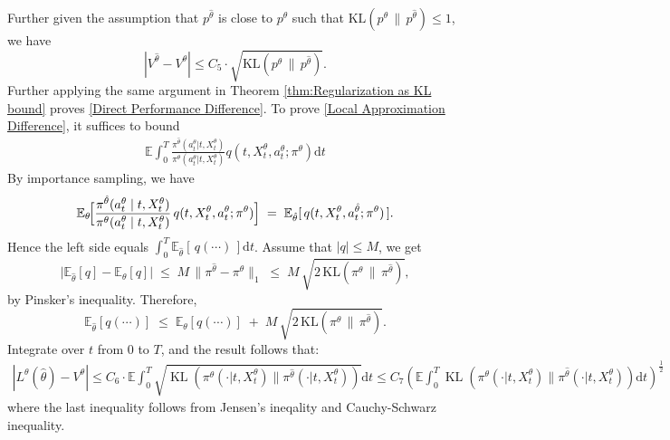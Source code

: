\documentclass{article}
\theoremstyle{plain}
\theoremstyle{definition}
\theoremstyle{remark}
\begin{document}
Further given the assumption that $p^{\hat{\theta}}$ is close to $p^{\theta}$ such that $\mathrm{KL}(p^{\theta} \,\|\, p^{\hat{\theta}})\leq 1$, we have 
$$
|V^{\hat{\theta}} - V^{\theta}|\leq C_5\cdot \sqrt{\mathrm{KL}(p^{\theta} \,\|\, p^{\hat{\theta}})}.
$$
Further applying the same argument in Theorem \ref{thm:Regularization as KL bound} proves \eqref{Direct Performance Difference}. To prove \eqref{Local Approximation Difference}, it suffices to bound 
\begin{eqnarray}
\mathbb{E}\int _ { 0 } ^ { T } \frac{\pi^ { \hat{\theta}}( a _ { t } ^ {\theta} | t , X _ { t } ^ {\theta} )}{\pi^ { \theta}( a _ { t } ^ {\theta} | t , X _ { t } ^ {\theta} )} q(t, X_t^{\theta}, a_t^{\theta} ; \pi^\theta)\mathrm{d} t
\end{eqnarray}
By importance sampling, we have
\[
\mathbb{E}_{\theta}\!\Bigl[
  \frac{\pi^{\hat{\theta}}(a_{t}^{\theta}\mid t, X_{t}^{\theta})}%
       {\pi^{\theta}(a_{t}^{\theta}\mid t, X_{t}^{\theta})}
  \,q(t, X_t^{\theta}, a_t^{\theta} ; \pi^\theta)
\Bigr]
\;=\;
\mathbb{E}_{\hat{\theta}}[\,q(t, X_t^{\theta}, a_t^{\hat{\theta}} ; \pi^\theta)\,].
\]
Hence the left side equals
$\int_0^T \mathbb{E}_{\hat{\theta}}[\,q(\cdots)\,]\mathrm{d}t$.
Assume that $|q|\le M$, we get
\[
\bigl|\mathbb{E}_{\hat{\theta}}[q] - \mathbb{E}_\theta[q]\bigr|
\;\le\;
M\,\|\pi^{\hat{\theta}} - \pi^\theta\|_1
\;\le\;
M\,\sqrt{2\,\mathrm{KL}(\pi^\theta\,\|\,\pi^{\hat{\theta}})},
\]
by Pinsker’s inequality.  Therefore,
\[
\mathbb{E}_{\hat{\theta}}[q(\cdots)]
\;\le\;
\mathbb{E}_\theta[q(\cdots)]
\;+\;
M\,\sqrt{2\,\mathrm{KL}(\pi^\theta\,\|\,\pi^{\hat{\theta}})}.
\]
Integrate over $t$ from $0$ to $T$, and the result follows that:
\begin{align}
|L^{\theta}(\hat{\theta}) - V^{\theta}|\leq C_6 \cdot \mathbb{E}\int_{0}^{T} \sqrt{\operatorname{KL}(\pi^{\theta}(\cdot | t , X _ { t } ^ {\theta} )\|\pi^{\hat{\theta}}( \cdot | t , X _ { t } ^ {\theta} ))}\mathrm{d}t \leq C_7 \left(\mathbb{E}\int_{0}^{T} \operatorname{KL}(\pi^{\theta}(\cdot | t , X _ { t } ^ {\theta} )\|\pi^{\hat{\theta}}( \cdot | t , X _ { t } ^ {\theta} ))\mathrm{d}t\right)^{\frac{1}{2}}
\end{align}
where the last inequality follows from Jensen's ineqality and Cauchy-Schwarz inequality.
\end{document}
